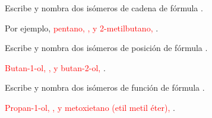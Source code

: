\begin{exercise}
    Escribe y nombra dos isómeros de cadena de fórmula .
    \begin{solu}
        Por ejemplo, \textcolor{red}{pentano, , y 2-metilbutano, }.
    \end{solu}
\end{exercise}

\begin{exercise}
    Escribe y nombra dos isómeros de posición de fórmula .
    \begin{solu}
        \textcolor{red}{Butan-1-ol, , y butan-2-ol, }.
    \end{solu}
\end{exercise}

\begin{exercise}
    Escribe y nombra dos isómeros de función de fórmula .
    \begin{solu}
        \textcolor{red}{Propan-1-ol, , y metoxietano (etil metil éter), }.
    \end{solu}
\end{exercise}

\fussy
